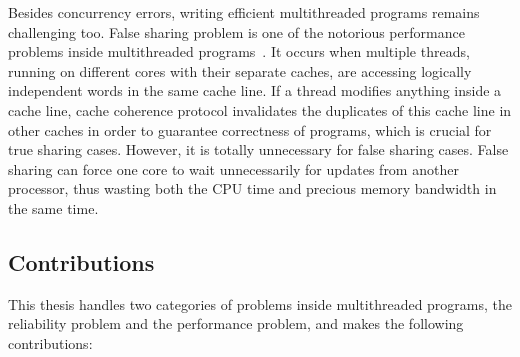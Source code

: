 Besides concurrency errors, writing efficient multithreaded programs remains challenging too. False sharing problem is one of the notorious performance problems inside multithreaded programs~\cite{falseshare:Analysis, falseshare:effect}. It occurs when multiple threads, running on different cores with their separate caches, are accessing logically independent words in the same cache line. If a thread modifies anything inside a cache line, cache coherence protocol invalidates the duplicates of this cache line in other caches in order to guarantee correctness of programs, which is crucial for true sharing cases. However, it is totally unnecessary for false sharing cases. False sharing can force one core to wait unnecessarily for updates from another processor, thus wasting both the CPU time and precious memory bandwidth in the same time. 

\subsection*{Contributions}

This thesis handles two categories of problems inside multithreaded programs, the reliability problem and the performance problem, and makes the following contributions:

